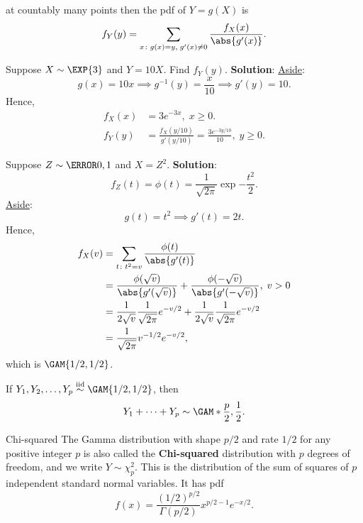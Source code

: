 at countably many points then the pdf of $ Y=g(X) $
is
\[ f_Y(y)=\sum_{x\colon g(x)=y,\; g'(x)\ne 0}\frac{f_X(x)}{\abs{g'(x)}}. \]
\begin{Example}{}{}
    Suppose $ X \sim \EXP{3} $ and $ Y=10X $. Find $ f_Y(y) $.
    \tcblower{}
    \textbf{Solution}:
    \underline{Aside}:
    \[ g(x)=10x\implies g^{-1}(y)=\frac{x}{10}\implies g'(y)=10. \]
    Hence,
    \begin{align*}
        f_X(x) & =3e^{-3x},\; x\ge 0.                                          \\
        f_Y(y) & =\frac{f_X(y/10)}{g'(y/10)}=\frac{3e^{-3y/10}}{10},\; y\ge 0.
    \end{align*}
\end{Example}
\begin{Example}{}{}
    Suppose $ Z \sim \N{0,1} $ and $ X=Z^2 $.
    \tcblower{}
    \textbf{Solution}:
    \[ f_Z(t)=\phi(t)=\frac{1}{\sqrt{2\pi}}\exp{-\frac{t^2}{2}}. \]
    \underline{Aside}:
    \[ g(t)=t^2\implies g'(t)=2t. \]
    Hence,
    \begin{align*}
        f_X(v)
         & =\sum_{t\colon t^2=v}\frac{\phi(t)}{\abs{g'(t)}}                                                   \\
         & =\frac{\phi(\sqrt{v})}{\abs{g'(\sqrt{v})}}+\frac{\phi(-\sqrt{v})}{\abs{g'(-\sqrt{v})}},\; v>0      \\
         & =\frac{1}{2\sqrt{v}}\frac{1}{\sqrt{2\pi}}e^{-v/2}+\frac{1}{2\sqrt{v}}\frac{1}{\sqrt{2\pi}}e^{-v/2} \\
         & =\frac{1}{\sqrt{2\pi}}v^{-1/2}e^{-v/2},
    \end{align*}
    which is $ \GAM{1/2,1/2} $.
\end{Example}
\begin{Example}{}{}
    If $ Y_1,Y_2,\ldots,Y_p \iid \GAM{1/2,1/2} $, then
    \[ Y_1+\cdots+Y_p \sim \GAM*{\frac{p}{2},\frac{1}{2}}. \]
\end{Example}
\begin{Definition}{Chi-squared}{}
    The Gamma distribution with shape $ p/2 $ and rate $ 1/2 $
    for any positive integer $ p $ is also called the
    \textbf{Chi-squared} distribution with $ p $ degrees of freedom,
    and we write $ Y \sim \chi^2_p $.
    This is the distribution of the sum of squares of $ p $
    independent standard normal variables. It has pdf
    \[ f(x)=\frac{(1/2)^{p/2}}{\Gamma(p/2)}x^{p/2-1}e^{-x/2}. \]
\end{Definition}
